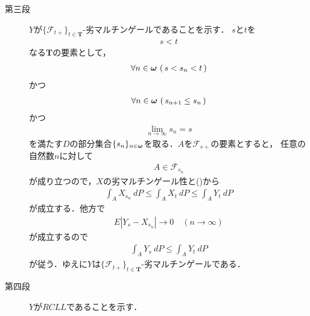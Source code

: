 \begin{sketch}
\begin{description}
			\item[第三段]
				$Y$が$\{\mathscr{F}_{t+}\}_{t \in \mathbf{T}}$-劣マルチンゲールであることを示す．
				$s$と$t$を
				\begin{align}
					s < t
				\end{align}
				なる$\mathbf{T}$の要素として，
				\begin{align}
					\forall n \in {\boldsymbol \omega}\, \left(\, s < s_n < t\, \right)
				\end{align}
				かつ
				\begin{align}
					\forall n \in {\boldsymbol \omega}\, \left(\, s_{n+1} \leq s_n\, \right)
				\end{align}
				かつ
				\begin{align}
					\lim_{n \to \infty} s_n = s
				\end{align}
				を満たす$D$の部分集合$\{s_n\}_{n \in {\boldsymbol \omega}}$を取る．$A$を$\mathscr{F}_{s+}$の要素とすると，
				任意の自然数$n$に対して
				\begin{align}
					A \in \mathscr{F}_{s_n}
				\end{align}
				が成り立つので，$X$の劣マルチンゲール性と()から
				\begin{align}
					\int_A X_{s_n}\ dP \leq \int_A X_t\ dP \leq \int_A Y_t\ dP
				\end{align}
				が成立する．他方で
				\begin{align}
					E\left|Y_s - X_{s_n}\right| \longrightarrow 0 \quad (n \longrightarrow \infty)
				\end{align}
				が成立するので
				\begin{align}
					\int_A Y_s\ dP \leq \int_A Y_t\ dP
				\end{align}
				が従う．ゆえに$Y$は$\{\mathscr{F}_{t+}\}_{t \in \mathbf{T}}$-劣マルチンゲールである．
				
			\item[第四段]
				$Y$が$RCLL$であることを示す．
				

\end{description}
\end{sketch}
